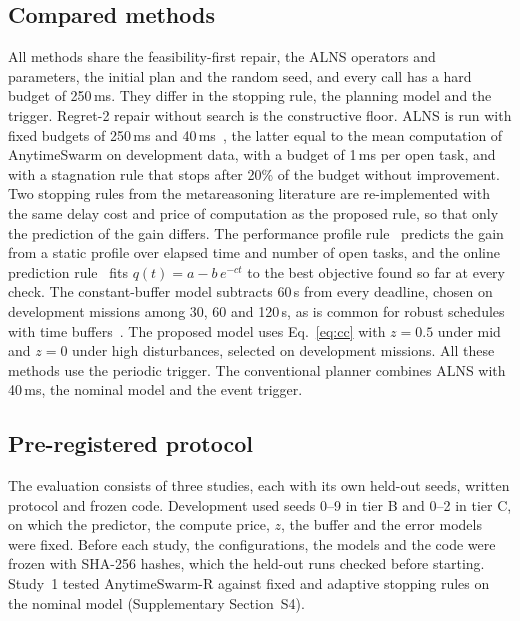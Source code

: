 \subsection{Compared methods}\label{sec:methods}
All methods share the feasibility-first repair, the ALNS operators and parameters, the initial plan and the random seed,
and every call has a hard budget of 250\,ms. They differ in the stopping rule, the planning model and the trigger.
Regret-2 repair without search is the constructive floor. ALNS is run with fixed budgets of 250\,ms and
40\,ms~\cite{ropke2006adaptive}, the latter equal to the mean computation of AnytimeSwarm on development data, with a
budget of 1\,ms per open task, and with a stagnation rule that stops after 20\% of the budget without improvement. Two
stopping rules from the metareasoning literature are re-implemented with the same delay cost and price of computation
as the proposed rule, so that only the prediction of the gain differs. The performance profile
rule~\cite{boddy1994deliberation,zilberstein1996using} predicts the gain from a static profile over elapsed time and
number of open tasks, and the online prediction rule~\cite{svegliato2018meta} fits $q(t)=a-b\,e^{-ct}$ to the best
objective found so far at every check. The constant-buffer model subtracts 60\,s from every deadline, chosen on
development missions among 30, 60 and 120\,s, as is common for robust schedules with time
buffers~\cite{agra2013robust}. The proposed model uses Eq.~\eqref{eq:cc} with $z=0.5$ under mid and $z=0$ under high
disturbances, selected on development missions. All these methods use the periodic trigger. The conventional planner
combines ALNS with 40\,ms, the nominal model and the event trigger.

\subsection{Pre-registered protocol}\label{sec:protocol}
The evaluation consists of three studies, each with its own held-out seeds, written protocol and frozen code.
Development used seeds 0--9 in tier B and 0--2 in tier C, on which the predictor, the compute price, $z$, the buffer and
the error models were fixed. Before each study, the configurations, the models and the code were frozen with SHA-256
hashes, which the held-out runs checked before starting. Study~1 tested AnytimeSwarm-R against fixed and adaptive
stopping rules on the nominal model (Supplementary Section~S4).

